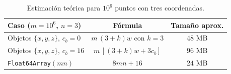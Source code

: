 \begin{table}[h]
\centering
\begin{tabular}{lcc}
\toprule
Caso ($m = 10^6$, $n = 3$) & Fórmula & Tamaño aprox. \\
\midrule
Objetos $\{x,y,z\}$, $c_b = 0$  & $m\,(3+k)w$ con $k=3$ & $48$ MB \\
Objetos $\{x,y,z\}$, $c_b = 16$ & $m\,[(3+k)w + 3c_b]$ & $96$ MB \\
\texttt{Float64Array}$(mn)$     & $8mn + 16$            & $24$ MB \\
\bottomrule
\end{tabular}
\caption{Estimación teórica para $10^6$ puntos con tres coordenadas.}
\end{table}